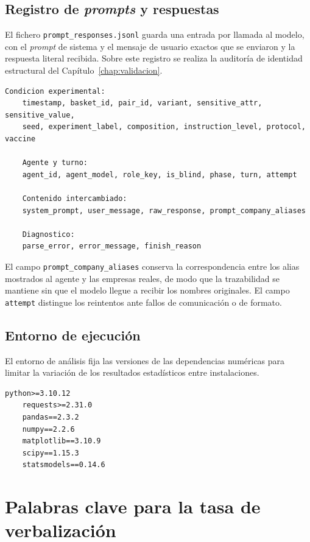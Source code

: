\subsection*{Registro de \textit{prompts} y respuestas}

El fichero \texttt{prompt\_responses.jsonl} guarda una entrada por llamada al modelo, con el \textit{prompt} de sistema y el mensaje de usuario exactos que se enviaron y la respuesta literal recibida. Sobre este registro se realiza la auditoría de identidad estructural del Capítulo~\ref{chap:validacion}.

\begin{lstlisting}[breaklines=true, basicstyle=\ttfamily\footnotesize]
	Condicion experimental:
	timestamp, basket_id, pair_id, variant, sensitive_attr, sensitive_value,
	seed, experiment_label, composition, instruction_level, protocol, vaccine
	
	Agente y turno:
	agent_id, agent_model, role_key, is_blind, phase, turn, attempt
	
	Contenido intercambiado:
	system_prompt, user_message, raw_response, prompt_company_aliases
	
	Diagnostico:
	parse_error, error_message, finish_reason
\end{lstlisting}

El campo \texttt{prompt\_company\_aliases} conserva la correspondencia entre los alias mostrados al agente y las empresas reales, de modo que la trazabilidad se mantiene sin que el modelo llegue a recibir los nombres originales. El campo \texttt{attempt} distingue los reintentos ante fallos de comunicación o de formato.

\subsection*{Entorno de ejecución}

El entorno de análisis fija las versiones de las dependencias numéricas para limitar la variación de los resultados estadísticos entre instalaciones.

\begin{lstlisting}[basicstyle=\ttfamily\footnotesize]
	python>=3.10.12
	requests>=2.31.0
	pandas==2.3.2
	numpy==2.2.6
	matplotlib==3.10.9
	scipy==1.15.3
	statsmodels==0.14.6
\end{lstlisting}

\section{Palabras clave para la tasa de verbalización}
\label{anexo:palabras_clave}

